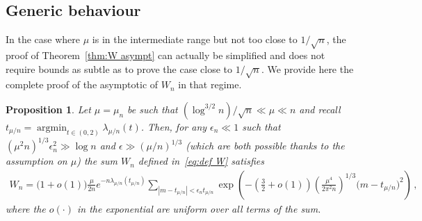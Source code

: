 \documentclass{article}
\DeclareMathOperator*{\argmin}{argmin}
\newcommand{\1}{\mathbbm{1}}								%
\newtheorem{proposition}[theorem]{Proposition}
\theoremstyle{definition}
\numberwithin{equation}{section}
\begin{document}
\subsection{Generic behaviour}

In the case where $\mu$ is in the intermediate range but not too close to $1/\sqrt{n}$, the proof of Theorem~\ref{thm:W asympt} can actually be simplified and does not require bounds as subtle as to prove the case close to $1/\sqrt{n}$.
We provide here the complete proof of the asymptotic of $W_n$ in that regime.

\begin{proposition}\label{prop:W as a sum}
    Let $\mu=\mu_n$ be such that $(\log^{3/2}n)/\sqrt{n}\ll\mu\ll n$ and {recall $t_{\mu/n}=\argmin_{t \in (0,2)}\lambda_{\mu/n}(t)$.}
    Then, for any $\epsilon_n\ll1$ such that $(\mu^2n)^{1/3}\epsilon_n^2\gg\log n$ and $\epsilon\gg(\mu/n)^{1/3}$ (which are both possible thanks to the assumption on $\mu$) the sum $W_n$ defined in~\eqref{eq:def W} satisfies
    \begin{align*}
        W_n=\big(1+o(1)\big)\frac{\mu}{2n}e^{-n\lambda_{\mu/n}(t_{\mu/n})}\sum_{|m-t_{\mu/n}|<\epsilon_nt_{\mu/n}}\exp\left(-\left(\frac{3}{2}+o(1)\right)\left(\frac{\mu^4}{2\pi^2n}\right)^{1/3}\big(m-t_{\mu/n}\big)^2\right)\,,
    \end{align*}
    where the $o(\cdot)$ in the exponential are uniform over all terms of the sum.
\end{proposition}
\end{document}
